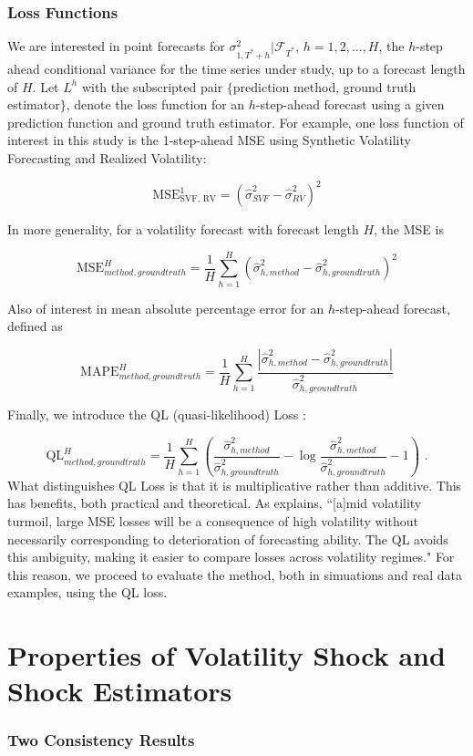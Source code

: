 \documentclass{beamer}
\theoremstyle{definition}
\begin{document}
\begin{frame}
\frametitle{Loss Functions}

We are interested in point forecasts for $\sigma^{2}_{1,T^{*}+h}|\mathcal{F}_{T^{*}}$, $h=1,2,...,H$, the $h$-step ahead conditional variance for the time series under study, up to a forecast length of $H$.  Let $L^{h}$ with the subscripted pair $\{$prediction method, ground truth estimator$\}$, denote the loss function for an $h$-step-ahead forecast using a given prediction function and ground truth estimator.  For example, one loss function of interest in this study is the 1-step-ahead MSE using Synthetic Volatility Forecasting and Realized Volatility:

$$ \text{MSE}^{1}_{\text{SVF, RV}} = (\hat\sigma^{2}_{SVF} - \hat\sigma^{2}_{RV})^{2}$$

In more generality, for a volatility forecast with forecast length $H$, the MSE is 

$$ \text{MSE}^{H}_{method, ground truth} = \frac{1}{H}\sum_{h=1}^{H}(\hat\sigma^{2}_{h, method} - \hat\sigma^{2}_{h, ground truth})^{2}$$

Also of interest in mean absolute percentage error for an $h$-step-ahead forecast, defined as

\[ 
\text{MAPE}^{H}_{method, ground truth} = \frac{1}{H}\sum_{h=1}^{H}\frac{|\hat\sigma^{2}_{h, method} - \hat\sigma^{2}_{h, ground truth}|}{\hat\sigma^{2}_{h, ground truth}}
\]

Finally, we introduce the QL (quasi-likelihood) Loss \parencite[][]{brownlees2011practical}:

\[ 
\text{QL}^{H}_{method, ground truth} = \frac{1}{H}\sum_{h=1}^{H} (\frac{ \hat\sigma^{2}_{h, method} }{\hat\sigma^{2}_{h, ground truth}} - \log{\frac{ \hat\sigma^{2}_{h, method} }{\hat\sigma^{2}_{h, ground truth}}} -1) \text{ .}
\]
What distinguishes QL Loss is that it is multiplicative rather than additive.  This has benefits, both practical and theoretical.  As \cite[][]{brownlees2011practical} explains, ``[a]mid volatility turmoil, large MSE
losses will be a consequence of high volatility without necessarily corresponding to
deterioration of forecasting ability. The QL avoids this ambiguity, making it easier to
compare losses across volatility regimes."  For this reason, we proceed to evaluate the method, both in simuations and real data examples, using the QL loss.

\end{frame}

\section{Properties of Volatility Shock and Shock Estimators}\label{SVF_properties}
\frametitle{Two Consistency Results}
\end{document}

